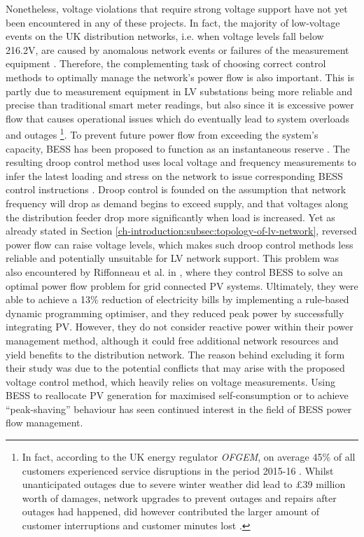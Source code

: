 Nonetheless, voltage violations that require strong voltage support have not yet been encountered in any of these projects.
In fact, the majority of low-voltage events on the UK distribution networks, i.e. when voltage levels fall below 216.2V, are caused by anomalous network events or failures of the measurement equipment \cite{UKPowerNetworks2014a}.
Therefore, the complementing task of choosing correct control methods to optimally manage the network's power flow is also important.
This is partly due to measurement equipment in LV substations being more reliable and precise than traditional smart meter readings, but also since it is excessive power flow that causes operational issues which do eventually lead to system overloads and outages \footnote{In fact, according to the UK energy regulator \textit{OFGEM}, on average 45\% of all customers experienced service disruptions in the period 2015-16 \cite{Ofgem2017}. Whilst unanticipated outages due to severe winter weather did lead to \pounds39 million worth of damages, network upgrades to prevent outages and repairs after outages had happened, did however contributed the larger amount of customer interruptions and customer minutes lost \cite{Ofgem2014}.}\cite{Putrus2009, Pillai2010}.
To prevent future power flow from exceeding the system's capacity, BESS has been proposed to function as an instantaneous reserve \cite{Kunisch1986a, Kunisch1986}.
The resulting droop control method uses local voltage and frequency measurements to infer the latest loading and stress on the network to issue corresponding BESS control instructions \cite{Engler2005a}.
Droop control is founded on the assumption that network frequency will drop as demand begins to exceed supply, and that voltages along the distribution feeder drop more significantly when load is increased.
Yet as already stated in Section \ref{ch-introduction:subsec:topology-of-lv-network}, reversed power flow can raise voltage levels, which makes such droop control methods less reliable and potentially unsuitable for LV network support.
This problem was also encountered by Riffonneau et al. in \cite{Riffonneau2011}, where they control BESS to solve an optimal power flow problem for grid connected PV systems.
Ultimately, they were able to achieve a 13\% reduction of electricity bills by implementing a rule-based dynamic programming optimiser, and they reduced peak power by successfully integrating PV.
However, they do not consider reactive power within their power management method, although it could free additional network resources and yield benefits to the distribution network.
The reason behind excluding it form their study was due to the potential conflicts that may arise with the proposed voltage control method, which heavily relies on voltage measurements.
Using BESS to reallocate PV generation for maximised self-consumption \cite{SaniHassan2017} or to achieve ``peak-shaving'' behaviour \cite{Bennett2015, DePaola2016} has seen continued interest in the field of BESS power flow management.

